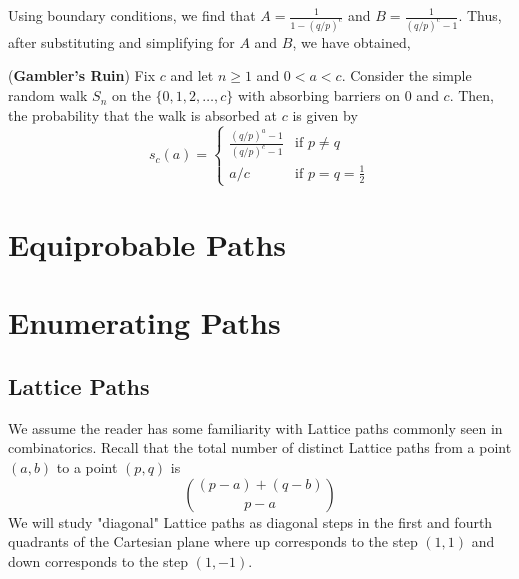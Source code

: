\documentclass[12pt]{article}
\theoremstyle{definition}
\numberwithin{equation}{section}
\newcommand{\Pro}{\ensuremath{\mathbb{P}}}
\newcommand{\set}[1]{\{#1\}}
\begin{document}
Using boundary conditions, we find that $A = \frac{1}{1 - (q/p)^c}$ and $B = \frac{1}{(q/p)^c - 1}$. Thus, after substituting and simplifying for $A$ and $B$, we have obtained,

\theorem (\textbf{Gambler's Ruin}) Fix $c$ and let $n\geq 1$ and $0<a<c$. Consider the simple random walk $S_n$ on the $\set{0,1,2,\ldots,c}$ with absorbing barriers on $0$ and $c$. Then, the probability that the walk is absorbed at $c$ is given by
\begin{equation}
    s_c(a) = \begin{cases}
        \frac{(q/p)^a - 1}{(q/p)^c - 1} & \text{if } p\neq q \\
        a/c & \text{if } p = q = \frac{1}{2}
    \end{cases}
\end{equation}



\newpage

\section*{Equiprobable Paths}
\section{Enumerating Paths}
\subsection{Lattice Paths}
We assume the reader has some familiarity with Lattice paths commonly seen in combinatorics. Recall that the total number of distinct Lattice paths from a point $(a,b)$ to a point $(p,q)$ is 
\begin{equation}
    \binom{(p-a) + (q-b)}{p-a}
\end{equation}
We will study "diagonal" Lattice paths as diagonal steps in the first and fourth quadrants of the Cartesian plane where up corresponds to the step $(1,1)$ and down corresponds to the step $(1,-1)$. %
\end{document}
